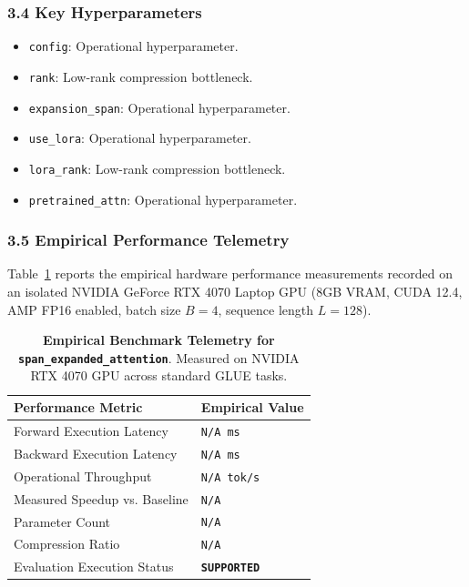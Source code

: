 \subsubsection*{3.4 Key Hyperparameters}
\begin{itemize}
    \item \texttt{config}: Operational hyperparameter.
    \item \texttt{rank}: Low-rank compression bottleneck.
    \item \texttt{expansion\_span}: Operational hyperparameter.
    \item \texttt{use\_lora}: Operational hyperparameter.
    \item \texttt{lora\_rank}: Low-rank compression bottleneck.
    \item \texttt{pretrained\_attn}: Operational hyperparameter.
\end{itemize}

\subsubsection*{3.5 Empirical Performance Telemetry}
Table~\ref{tab:telemetry_span\_expanded\_attention} reports the empirical hardware performance measurements recorded on an isolated NVIDIA GeForce RTX 4070 Laptop GPU (8GB VRAM, CUDA 12.4, AMP FP16 enabled, batch size $B=4$, sequence length $L=128$).

\begin{table}[h]
\centering
\small
\caption{\textbf{Empirical Benchmark Telemetry for \texttt{span\_expanded\_attention}}. Measured on NVIDIA RTX 4070 GPU across standard GLUE tasks.}
\label{tab:telemetry_span\_expanded\_attention}
\begin{tabularx}{\columnwidth}{lX}
\toprule
\textbf{Performance Metric} & \textbf{Empirical Value} \\
\midrule
Forward Execution Latency & \texttt{N/A ms} \\
Backward Execution Latency & \texttt{N/A ms} \\
Operational Throughput & \texttt{N/A tok/s} \\
Measured Speedup vs. Baseline & \texttt{N/A} \\
Parameter Count & \texttt{N/A} \\
Compression Ratio & \texttt{N/A} \\
Evaluation Execution Status & \textbf{\texttt{SUPPORTED}} \\
\bottomrule
\end{tabularx}
\end{table}

